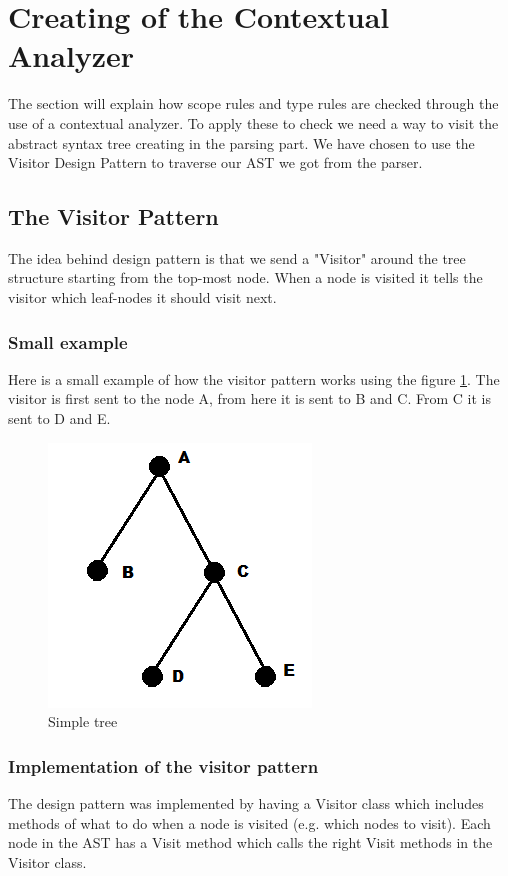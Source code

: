 \section{Creating of the Contextual Analyzer}
	The section will explain how scope rules and type rules are checked through the use of a contextual analyzer.
	To apply these to check we need a way to visit the abstract syntax tree creating in the parsing part. We have chosen to use 
	the Visitor Design Pattern to traverse our AST we got from the parser.
	
	\subsection{The Visitor Pattern}
		The idea behind design pattern is that we send a "Visitor" around the tree structure starting from the top-most node. When a node is 
		visited it tells the visitor which leaf-nodes it should visit next. \\
		
		\subsubsection*{Small example}
			Here is a small example of how the visitor pattern works using the figure \ref{fig:simpletree}. 
			The visitor is first sent to the node A, from here it is sent to B and C. From C it is sent to D and E.
		
			\begin{figure}
				\centering
				\includegraphics{rapport/6/figures/simpletree}
				\caption{Simple tree} \label{fig:simpletree}
			\end{figure}
			
		\subsubsection{Implementation of the visitor pattern}
			The design pattern was implemented by having a Visitor class which includes methods of what to do when a node is visited 
			(e.g. which nodes to visit). Each node in the AST has a Visit method which calls the right Visit methods in the Visitor class. \\
	
